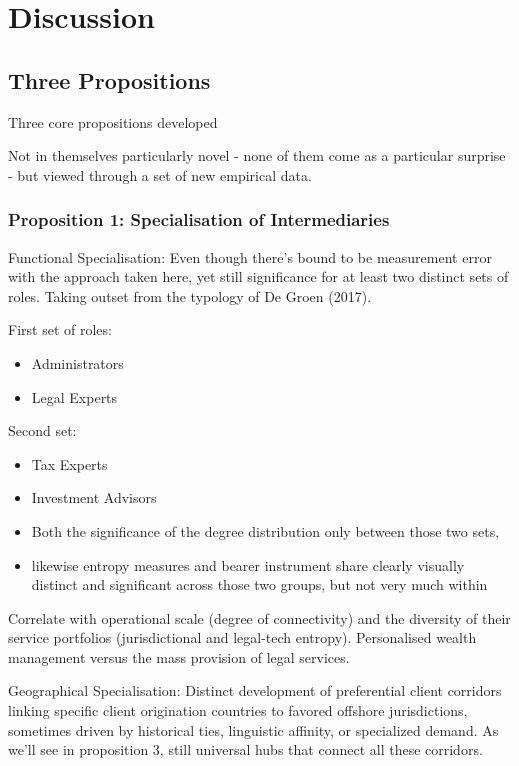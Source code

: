 \chapter{Discussion}
\label{chap:discussion}

\section{Three Propositions}

Three core propositions developed

Not in themselves particularly novel - none of them come as a particular surprise - but viewed through a set of new empirical data.
\subsection{Proposition 1: Specialisation of Intermediaries}

Functional Specialisation: Even though there's bound to be measurement error with the approach taken here, yet still significance for at least two distinct sets of roles. Taking outset from the typology of De Groen (2017). 

First set of roles:
\begin{itemize}
  \item Administrators
  \item Legal Experts
\end{itemize}

Second set:
\begin{itemize}
  \item Tax Experts
  \item Investment Advisors
\end{itemize}

\begin{itemize}
\item Both the significance of the degree distribution only between those two sets,
\item likewise entropy measures and bearer instrument share clearly visually distinct and significant across those two groups, but not very much within
\end{itemize}

Correlate with operational scale (degree of connectivity) and the diversity of their service portfolios (jurisdictional and legal-tech entropy). Personalised wealth management versus the mass provision of legal services.

Geographical Specialisation: Distinct development of preferential client corridors linking specific client origination countries to favored offshore jurisdictions, sometimes driven by historical ties, linguistic affinity, or specialized demand. As we'll see in proposition 3, still universal hubs that connect all these corridors.

